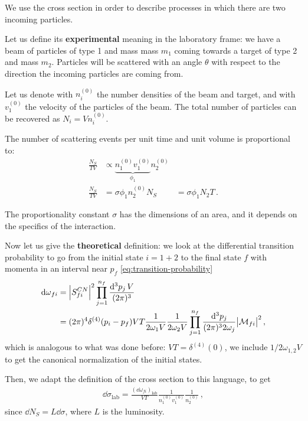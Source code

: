 \documentclass[main.tex]{subfiles}
\begin{document}
We use the cross section in order to describe processes in which there are two incoming particles. 

Let us define its \textbf{experimental} meaning in the laboratory frame: we have a beam of particles of type 1 and mass mass \(m_1 \) coming towards a target of type 2 and mass \(m_2 \). 
Particles will be scattered with an angle \(\theta \) with respect to the direction the incoming particles are coming from. 

Let us denote with \(n_{i}^{(0)}\) the number densities of the beam and target, and with \(v_{1}^{(0)}\) the velocity of the particles of the beam. 
The total number of particles can be recovered as \(N_i = V n_i^{(0)}\).

The number of scattering events per unit time and unit volume is proportional to: 
%
\begin{align}
\frac{N_S}{T V} &\propto \underbrace{n_1^{(0)} v_1 ^{(0)}}_{\phi_1 } n^{(0)}_{2}  \\
\frac{N_S}{T V} &= \sigma \phi_1 n^{(0)}_{2} 
N_S &= \sigma \phi_1 N_2 T
\,.
\end{align}

The proportionality constant \(\sigma \) has the dimensions of an area, and it depends on the specifics of the interaction. 

Now let us give the \textbf{theoretical} definition: we look at the differential transition probability to go from the initial state \(i = 1+2\) to the final state \(f\) with momenta in an interval near \(p_f\) \eqref{eq:transition-probability}
%
\begin{align}
\dd{\omega}_{fi} &= \abs{S^{CN}_{fi}}^2 \prod_{j=1}^{n_f} \frac{ \dd[3]{p_j} V}{(2 \pi )^3}  \\
&= (2\pi )^{4} \delta^{(4)} (p_i - p_f) VT \frac{1}{2 \omega_{1} V}
\frac{1}{2 \omega_{2}V}
\prod_{j=1}^{n_f} \frac{ \dd[3]{p_j}}{(2 \pi )^3 2 \omega_{j}}
\abs{\mathcal{M}_{fi}}^2
\,,
\end{align}
%
which is analogous to what was done before: \(VT = \delta^{(4)}(0)\), we include \(1 / 2 \omega_{1, 2} V\) to get the canonical normalization of the initial states. 

Then, we adapt the definition of the cross section to this language, to get
%
\begin{align}
\dd{\sigma }_{\text{lab}} = \frac{ (\dd{\omega_{fi}} ) _{\text{lab}}}{VT} 
\frac{1}{n_1^{(0)} v_1 ^{(0)}} 
\frac{1}{n_2^{(0)}} 
\,,
\end{align}
%
since \(\dd{N_S} = L \dd{\sigma }\), where \(L\) is the luminosity.
\end{document}
